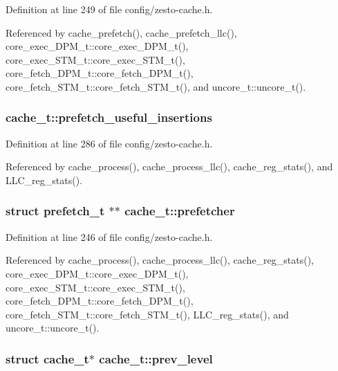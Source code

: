 Definition at line 249 of file config/zesto-cache.h.

Referenced by cache\_\-prefetch(), cache\_\-prefetch\_\-llc(), core\_\-exec\_\-DPM\_\-t::core\_\-exec\_\-DPM\_\-t(), core\_\-exec\_\-STM\_\-t::core\_\-exec\_\-STM\_\-t(), core\_\-fetch\_\-DPM\_\-t::core\_\-fetch\_\-DPM\_\-t(), core\_\-fetch\_\-STM\_\-t::core\_\-fetch\_\-STM\_\-t(), and uncore\_\-t::uncore\_\-t().
\subsubsection[{prefetch\_\-useful\_\-insertions}]{ {\bf cache\_\-t::prefetch\_\-useful\_\-insertions}}\label{structcache__t_ab8823b939322555622e48f909d24d7b}




Definition at line 286 of file config/zesto-cache.h.

Referenced by cache\_\-process(), cache\_\-process\_\-llc(), cache\_\-reg\_\-stats(), and LLC\_\-reg\_\-stats().
\subsubsection[{prefetcher}]{\setlength{\rightskip}{0pt plus 5cm}struct {\bf prefetch\_\-t} $\ast$$\ast$ {\bf cache\_\-t::prefetcher}\hspace{0.3cm}{\tt  [read]}}\label{structcache__t_2f92869438ffe1d24402149ebb194b8e}




Definition at line 246 of file config/zesto-cache.h.

Referenced by cache\_\-process(), cache\_\-process\_\-llc(), cache\_\-reg\_\-stats(), core\_\-exec\_\-DPM\_\-t::core\_\-exec\_\-DPM\_\-t(), core\_\-exec\_\-STM\_\-t::core\_\-exec\_\-STM\_\-t(), core\_\-fetch\_\-DPM\_\-t::core\_\-fetch\_\-DPM\_\-t(), core\_\-fetch\_\-STM\_\-t::core\_\-fetch\_\-STM\_\-t(), LLC\_\-reg\_\-stats(), and uncore\_\-t::uncore\_\-t().
\subsubsection[{prev\_\-level}]{\setlength{\rightskip}{0pt plus 5cm}struct {\bf cache\_\-t}$\ast$ {\bf cache\_\-t::prev\_\-level}\hspace{0.3cm}{\tt  [read]}}\label{structcache__t_1e23c1c031a25966dd96bd54c3862c2e}




